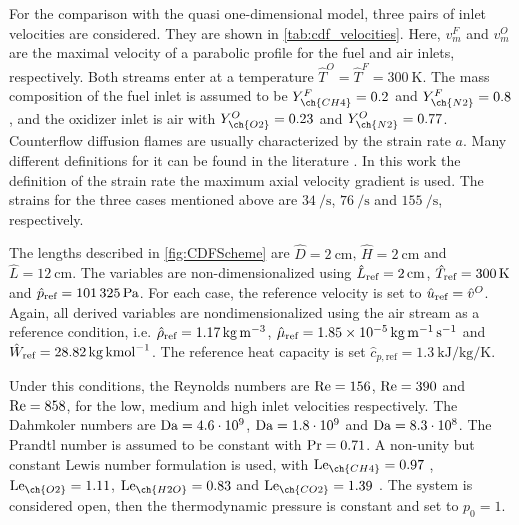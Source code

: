For the comparison with the quasi one-dimensional model, three pairs of inlet velocities are considered. They are shown in \cref{tab:cdf_velocities}. Here, $v_m^F$ and $v_m^O$ are the maximal velocity of a parabolic profile for the fuel and air inlets, respectively. Both streams enter at a temperature $\hat T^O = \hat T^F = \SI{300}{\kelvin}$. The mass composition of the fuel inlet is assumed to be  $Y^F_{\ch{CH4}} = 0.2$ and $Y^F_{\ch{N2}} = 0.8$, and the oxidizer inlet is air with  $Y^O_{\ch{O2}} = 0.23$ and $Y^O_{\ch{N2}} = 0.77$. 
Counterflow diffusion flames are usually characterized by the strain rate $a$. Many different definitions for it can be found in the literature \citep{fialaNonpremixedCounterflowFlames2014}. In this work the definition of the strain rate the maximum axial velocity gradient is used. The strains for the three cases mentioned above are $\SI{34}{\per\second}$, $\SI{76}{\per\second}$ and $\SI{155}{\per\second}$, respectively. 

The lengths described in \cref{fig:CDFScheme} are $\hat D = \SI{2}{\centi\meter}$, $\hat H = \SI{2}{\centi\meter}$ and $\hat L = \SI{12}{\centi\meter}$. The variables are non-dimensionalized using $\hat L_{\text{ref}} = \SI{2}{\centi\meter}$, $\hat T_{\text{ref}} = \SI{300}{\kelvin}$ and $\hat p_{\text{ref}} = \SI{101325}{\pascal}$.  For each case, the reference velocity is set to $\hat u_{\text{ref}} = \hat v^O$.  Again, all derived variables are nondimensionalized using the air stream as a reference condition, i.e. $\hat \rho_{\text{ref}} = \SI{1.17}{\kilo \gram \per \cubic \meter}$, $\hat \mu_{\text{ref}} = \SI{1.85e-5}{\kilo \gram \per \meter \per \second}$ and $\hat W_{\text{ref}} = \SI{28.82}{\kilo \gram \per \kilo\mole}$. The reference heat capacity is set $\hat{c}_{p,\text{ref}}= \SI{1.3}{\kilo \joule \per \kilo \gram \per \kelvin}$. 

Under this conditions, the Reynolds numbers are $\text{Re} = 156$, $\text{Re} = 390$ and $\text{Re} = 858$, for the low, medium and high inlet velocities respectively. The Dahmkoler numbers are $\text{Da} = 4.6\cdot10^9$, $\text{Da} = 1.8\cdot10^9$ and $\text{Da} = 8.3\cdot10^8$. The Prandtl number is assumed to be constant with $\text{Pr} = 0.71$. A non-unity but constant Lewis number formulation is used, with $\Lewis_{\ch{CH4}} =  0.97 $ , $\Lewis_{\ch{O2}} = 1.11 $, $\Lewis_{\ch{H2O}} = 0.83 $ and $\Lewis_{\ch{CO2}} = 1.39 $ \citep{smookePremixedNonpremixedTest1991}. The system is considered open, then the thermodynamic pressure is constant and set to  $ p_0 = 1$. 

